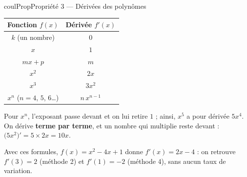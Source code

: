 \documentclass[11pt,a4paper]{article}
\makeatletter
\newcounter{lycee@signet}
\newcommand{\signet}[3][]{\stepcounter{lycee@signet}%
  \edef\lycee@dest{\if\relax\detokenize{#1}\relax
    signet.\arabic{lycee@signet}\else#1\fi}%
  \hypertarget{\lycee@dest}{}\bookmark[level=#2,dest=\lycee@dest]{#3}}
\newenvironment{proprietebox}[1][Propriété]%
  {\begin{boitecours}[phantom={\signet{2}{#1}}]{coulProp}{#1}}{\end{boitecours}}
\makeatother
\begin{document}
\begin{proprietebox}[Propriété 3 --- Dérivées des polynômes]
\begin{center}
\renewcommand{\arraystretch}{1.8}\setlength{\tabcolsep}{14pt}
\begin{tabular}{|c|c|}
\hline
\textbf{Fonction} $f(x)$ & \textbf{Dérivée} $f'(x)$\\
\hline
$k$ (un nombre) & $0$\\
\hline
$x$ & $1$\\
\hline
$mx+p$ & $m$\\
\hline
$x^{2}$ & $2x$\\
\hline
$x^{3}$ & $3x^{2}$\\
\hline
$x^{n}$ \quad ($n=4$, $5$, $6$\dots) & $n\,x^{n-1}$\\
\hline
\end{tabular}
\end{center}
Pour $x^{n}$, l'exposant passe devant et on lui retire $1$ ; ainsi, $x^{5}$ a pour dérivée
$5x^{4}$.
On dérive \textbf{terme par terme}, et un nombre qui multiplie reste devant :
$\big(5x^{2}\big)'=5\times 2x=10x$.
\end{proprietebox}

\begin{remarquebox}
Avec ces formules, $f(x)=x^{2}-4x+1$ donne $f'(x)=2x-4$ : on retrouve $f'(3)=2$
(méthode 2) et $f'(1)=-2$ (méthode 4), sans aucun taux de variation.
\end{remarquebox}
\end{document}
